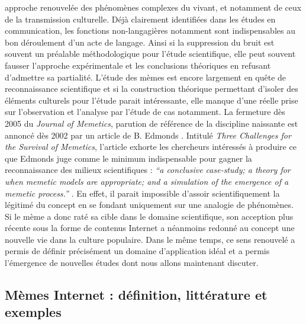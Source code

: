 approche renouvelée des phénomènes complexes du vivant, et notamment de ceux de la transmission culturelle. Déjà clairement identifiées dans les études en communication, les fonctions non-langagières notamment sont indispensables au bon déroulement d{\textquoteright}un acte de langage. Ainsi si la suppression du bruit est souvent un préalable méthodologique pour l{\textquoteright}étude scientifique, elle peut souvent fausser l{\textquoteright}approche expérimentale et les conclusions théoriques en refusant d{\textquoteright}admettre sa partialité. L{\textquoteright}étude des mèmes est encore largement en quête de reconnaissance scientifique et si la construction théorique permettant d{\textquoteright}isoler des éléments culturels pour l{\textquoteright}étude parait intéressante, elle manque d{\textquoteright}une réelle prise sur l{\textquoteright}observation et l{\textquoteright}analyse par l{\textquoteright}étude de cas notamment. La fermeture dès 2005 du \textit{Journal of Memetics}, parution de référence de la discipline naissante est annoncé dès 2002 par un article de B. Edmonds \citep{Jouxtel2014}. Intitulé \textit{Three Challenges for the Survival of Memetics}, l{\textquoteright}article\textit{ }exhorte les chercheurs intéressés à produire ce que Edmonds juge comme le minimum indispensable pour gagner la reconnaissance des milieux scientifiques : \textit{{\textquotedblleft}a conclusive case-study; a theory for when memetic models are appropriate; and a simulation of the emergence of a memetic process.{\textquotedblright}} \citep{Edmonds2002}.  
En effet, il parait impossible d{\textquoteright}assoir scientifiquement la légitimé du concept en se fondant uniquement sur une analogie de phénomènes. Si le mème a donc raté sa cible dans le domaine scientifique, son acception plus récente sous la forme de contenus Internet a néanmoins redonné au concept une nouvelle vie dans la culture populaire. Dans le même temps, ce sens renouvelé a permis de définir précisément un domaine d{\textquoteright}application idéal et a permis l{\textquoteright}émergence de nouvelles études dont nous allons maintenant discuter. 

\subsection[ Mèmes Internet : définition, littérature et exemples]{Mèmes Internet : définition, littérature et exemples}

